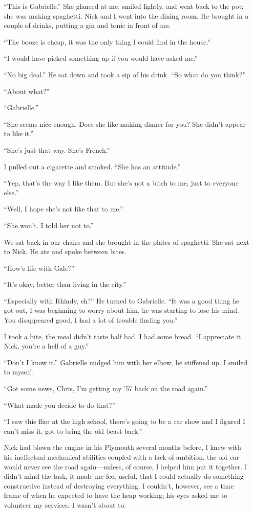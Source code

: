 ``This is Gabrielle.'' She glanced at me, smiled lightly, and went back
to the pot; she was making spaghetti. Nick and I went into the dining
room. He brought in a couple of drinks, putting a gin and tonic in front
of me.

``The booze is cheap, it was the only thing I could find in the house.''

``I would have picked something up if you would have asked me.''

``No big deal.'' He sat down and took a sip of his drink. ``So what do
you think?''

``About what?''

``Gabrielle.''

``She seems nice enough. Does she like making dinner for you? She didn't
appear to like it.''

``She's just that way. She's French.''

I pulled out a cigarette and smoked. ``She has an attitude.''

``Yep, that's the way I like them. But she's not a bitch to me, just to
everyone else.''

``Well, I hope she's not like that to me.''

``She won't. I told her not to.''

We sat back in our chairs and she brought in the plates of spaghetti.
She sat next to Nick. He ate and spoke between bites.

``How's life with Gale?''

``It's okay, better than living in the city.''

``Especially with Rhindy, eh?'' He turned to Gabrielle. ``It was a good
thing he got out, I was beginning to worry about him, he was starting to
lose his mind. You disappeared good, I had a lot of trouble finding
you.''

I took a bite, the meal didn't taste half bad. I had some bread. ``I
appreciate it Nick, you're a hell of a guy.''

``Don't I know it.'' Gabrielle nudged him with her elbow, he stiffened
up. I smiled to myself.

``Got some news, Chris, I'm getting my '57 back on the road again.''

``What made you decide to do that?''

``I saw this flier at the high school, there's going to be a car show
and I figured I can't miss it, got to bring the old beast back.''

Nick had blown the engine in his Plymouth several months before, I knew
with his ineffectual mechanical abilities coupled with a lack of
ambition, the old car would never see the road again---unless, of
course, I helped him put it together. I didn't mind the task, it made me
feel useful, that I could actually do something constructive instead of
destroying everything. I couldn't, however, see a time frame of when he
expected to have the heap working; his eyes asked me to volunteer my
services. I wasn't about to.

